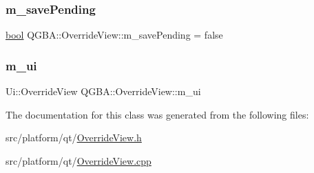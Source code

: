 \mbox{\label{class_q_g_b_a_1_1_override_view_ac1d726e965ec00eaee7d25e83d26689d}} 
\subsubsection{\texorpdfstring{m\+\_\+save\+Pending}{m\_savePending}}
{\footnotesize\ttfamily \mbox{\hyperlink{libretro_8h_a4a26dcae73fb7e1528214a068aca317e}{bool}} Q\+G\+B\+A\+::\+Override\+View\+::m\+\_\+save\+Pending = false\hspace{0.3cm}{\ttfamily [private]}}

\mbox{\label{class_q_g_b_a_1_1_override_view_ad087a8daddb6ae2c8806e6d352a3192e}} 
\subsubsection{\texorpdfstring{m\+\_\+ui}{m\_ui}}
{\footnotesize\ttfamily Ui\+::\+Override\+View Q\+G\+B\+A\+::\+Override\+View\+::m\+\_\+ui\hspace{0.3cm}{\ttfamily [private]}}



The documentation for this class was generated from the following files\+:\begin{DoxyCompactItemize}
\item 
src/platform/qt/\mbox{\hyperlink{_override_view_8h}{Override\+View.\+h}}\item 
src/platform/qt/\mbox{\hyperlink{_override_view_8cpp}{Override\+View.\+cpp}}\end{DoxyCompactItemize}

